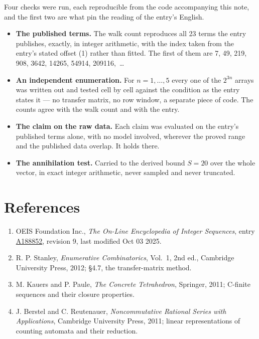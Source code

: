 \documentclass[11pt]{article}
\theoremstyle{definition}
\begin{document}
Four checks were run, each reproducible from the code accompanying this note, and the first two are what pin the reading of the entry's English.

\begin{itemize}

\item {\bfseries The published terms.} The walk count reproduces all 23 terms the entry publishes, exactly, in integer arithmetic, with the index taken from the entry's stated offset (1) rather than fitted. The first of them are 7, 49, 219, 908, 3642, 14265, 54914, 209116,~\dots

\item {\bfseries An independent enumeration.} For $n = 1,\dots,5$ every one of the $2^{3n}$ arrays was written out and tested cell by cell against the condition as the entry states it --- no transfer matrix, no row window, a separate piece of code. The counts agree with the walk count and with the entry.

\item {\bfseries The claim on the raw data.} Each claim was evaluated on the entry's published terms alone, with no model involved, wherever the proved range and the published data overlap. It holds there.

\item {\bfseries The annihilation test.} Carried to the derived bound $S = 20$ over the whole vector, in exact integer arithmetic, never sampled and never truncated.

\end{itemize}

\section{References}

\begin{enumerate}

\item OEIS Foundation Inc., \emph{The On-Line Encyclopedia of Integer Sequences}, entry \href{https://oeis.org/A188852}{A188852}, revision 9, last modified Oct 03 2025.

\item R. P. Stanley, \emph{Enumerative Combinatorics}, Vol.~1, 2nd ed., Cambridge University Press, 2012; \S4.7, the transfer-matrix method.

\item M. Kauers and P. Paule, \emph{The Concrete Tetrahedron}, Springer, 2011; C-finite sequences and their closure properties.

\item J. Berstel and C. Reutenauer, \emph{Noncommutative Rational Series with Applications}, Cambridge University Press, 2011; linear representations of counting automata and their reduction.

\end{enumerate}
\end{document}
